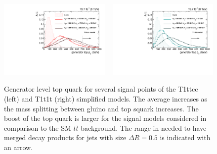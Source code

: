 \begin{figure}[htpb]
\centering
\includegraphics[width=0.48\textwidth]{figures/razor_strategy/T1ttcc_gentoppt}
~
\includegraphics[width=0.48\textwidth]{figures/razor_strategy/T1t1t_gentoppt}
\caption{Generator level top quark \pt for several signal points of the T1ttcc (left) and T1t1t
(right) simplified models. The average \pt increases as the mass splitting between gluino
and top squark increases. The boost of
the top quark is larger for the signal models considered in comparison to the SM $t\bar{t}$
background. 
The range in \pt needed to have merged decay products for jets with size $\Delta R = 0.5$ is
indicated with an arrow. 
\label{fig:boost_gen_toppt}}
\end{figure}
